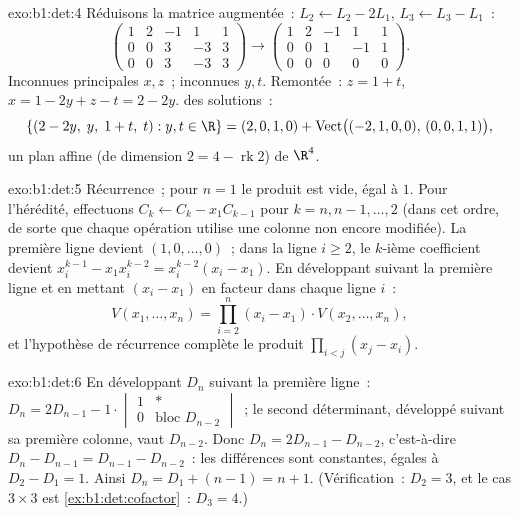 \begin{solution}{exo:b1:det:4}
Réduisons la matrice augmentée~: $L_2 \leftarrow L_2 - 2L_1$, $L_3
\leftarrow L_3 - L_1$~:
\[
\begin{pmatrix}
1 & 2 & -1 & 1 & 1\\
0 & 0 & 3 & -3 & 3\\
0 & 0 & 3 & -3 & 3
\end{pmatrix}
\to
\begin{pmatrix}
1 & 2 & -1 & 1 & 1\\
0 & 0 & 1 & -1 & 1\\
0 & 0 & 0 & 0 & 0
\end{pmatrix}.
\]
Inconnues principales $x, z$~; inconnues  $y, t$. Remontée~:
$z = 1 + t$, $x = 1 - 2y + z - t = 2 - 2y$.  des solutions~:
\[
\{(2 - 2y,\; y,\; 1 + t,\; t) : y, t \in \R\}
= (2, 0, 1, 0) + \operatorname{Vect}\bigl((-2,1,0,0),\,
(0,0,1,1)\bigr),
\]
un plan affine (de dimension $2 = 4 - \operatorname{rk} 2$) de $\R^4$.
\end{solution}

\begin{solution}{exo:b1:det:5}
Récurrence~; pour $n = 1$ le produit est vide, égal à $1$. Pour
l'hérédité, effectuons $C_k \leftarrow C_k - x_1 C_{k-1}$ pour
$k = n, n-1, \dots, 2$ (dans cet ordre, de sorte que chaque opération
utilise une colonne non encore modifiée). La première ligne devient
$(1, 0, \dots, 0)$~; dans la ligne $i \geq 2$, le $k$-ième coefficient
devient $x_i^{k-1} - x_1 x_i^{k-2} = x_i^{k-2}(x_i - x_1)$. En
développant suivant la première ligne et en mettant $(x_i - x_1)$ en
facteur dans chaque ligne $i$~:
\[
V(x_1, \dots, x_n)
= \prod_{i=2}^{n} (x_i - x_1)\cdot V(x_2, \dots, x_n),
\]
et l'hypothèse de récurrence complète le produit $\prod_{i<j}(x_j
- x_i)$.
\end{solution}

\begin{solution}{exo:b1:det:6}
En développant $D_n$ suivant la première ligne~: $D_n = 2 D_{n-1} -
1\cdot\begin{vmatrix} 1 & \ast\\ 0 & \text{bloc } D_{n-2}
\end{vmatrix}$~; le second déterminant, développé suivant sa première
colonne, vaut $D_{n-2}$. Donc $D_n = 2D_{n-1} - D_{n-2}$,
c'est-à-dire $D_n - D_{n-1} = D_{n-1} - D_{n-2}$~: les différences sont
constantes, égales à $D_2 - D_1 = 1$. Ainsi $D_n = D_1 + (n - 1) = n + 1$.
(Vérification~: $D_2 = 3$, et le cas $3\times3$ est
\cref{ex:b1:det:cofactor}~: $D_3 = 4$.)
\end{solution}

